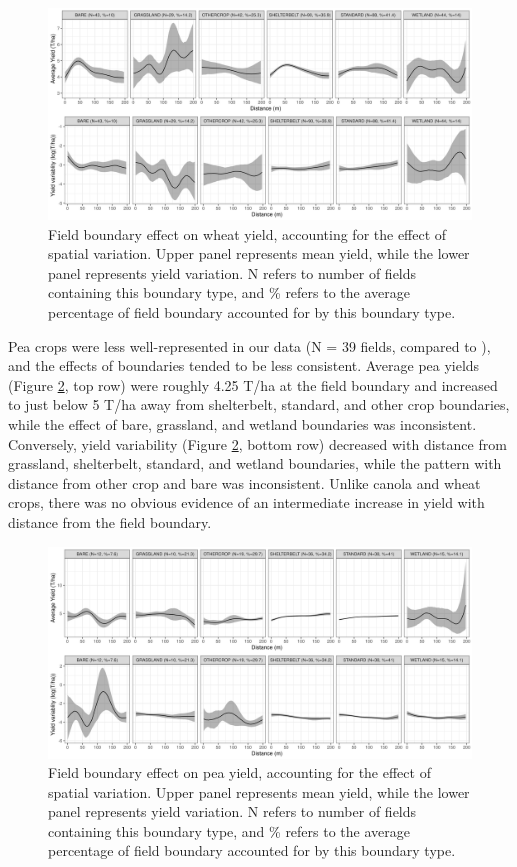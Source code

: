 \documentclass[]{elsarticle} %
\begin{document}
\begin{figure}
\includegraphics[width=1\linewidth]{../Figures/ModelSummary3a_wheat} \caption{Field boundary effect on wheat yield, accounting for the effect of spatial variation. Upper panel represents mean yield, while the lower panel represents yield variation. N refers to number of fields containing this boundary type, and \% refers to the average percentage of field boundary accounted for by this boundary type.}\label{fig:wheatPlot}
\end{figure}

Pea crops were less well-represented in our data (N = 39 fields, compared to ), and the effects of boundaries tended to be less consistent.
Average pea yields (Figure \ref{fig:peaPlot}, top row) were roughly 4.25 T/ha at the field boundary and increased to just below 5 T/ha away from shelterbelt, standard, and other crop boundaries, while the effect of bare, grassland, and wetland boundaries was inconsistent.
Conversely, yield variability (Figure \ref{fig:peaPlot}, bottom row) decreased with distance from grassland, shelterbelt, standard, and wetland boundaries, while the pattern with distance from other crop and bare was inconsistent.
Unlike canola and wheat crops, there was no obvious evidence of an intermediate increase in yield with distance from the field boundary.

\begin{figure}
\includegraphics[width=1\linewidth]{../Figures/ModelSummary3a_peas} \caption{Field boundary effect on pea yield, accounting for the effect of spatial variation. Upper panel represents mean yield, while the lower panel represents yield variation. N refers to number of fields containing this boundary type, and \% refers to the average percentage of field boundary accounted for by this boundary type.}\label{fig:peaPlot}
\end{figure}
\end{document}
